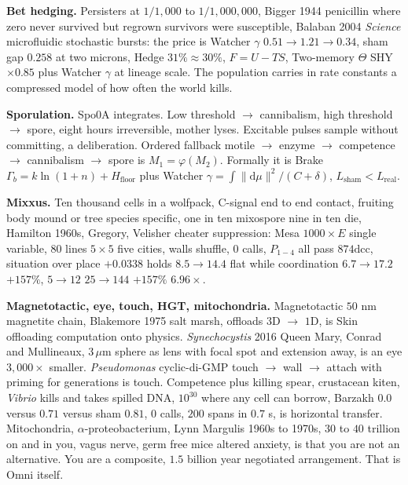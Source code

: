 \documentclass[11pt,a4paper]{article}
\begin{document}
\textbf{Bet hedging.} Persisters at $1/1{,}000$ to $1/1{,}000{,}000$, Bigger 1944 penicillin where zero never survived but regrown survivors were susceptible, Balaban 2004 \textit{Science} microfluidic stochastic bursts: the price is Watcher $\gamma$ $0.51 \to 1.21 \to 0.34$, sham gap $0.258$ at two microns, Hedge $31\% \approx 30\%$, $F = U - TS$, Two-memory $\Theta$ SHY $\times 0.85$ plus Watcher $\gamma$ at lineage scale. The population carries in rate constants a compressed model of how often the world kills.

\textbf{Sporulation.} Spo0A integrates. Low threshold $\to$ cannibalism, high threshold $\to$ spore, eight hours irreversible, mother lyses. Excitable pulses sample without committing, a deliberation. Ordered fallback motile $\to$ enzyme $\to$ competence $\to$ cannibalism $\to$ spore is $M_1 = \varphi(M_2)$. Formally it is Brake $\Gamma_b = k \ln(1+n) + H_{\text{floor}}$ plus Watcher $\gamma = \int \|\mathrm{d}\mu\|^2/(C+\delta)$, $L_{\text{sham}} < L_{\text{real}}$.

\textbf{Mixxus.} Ten thousand cells in a wolfpack, C-signal end to end contact, fruiting body mound or tree species specific, one in ten mixospore nine in ten die, Hamilton 1960s, Gregory, Velisher cheater suppression: Mesa $1000\times E$ single variable, $80$ lines $5 \times 5$ five cities, walls shuffle, $0$ calls, $P_{1-4}$ all pass $874\text{dcc}$, situation over place $+0.0338$ holds $8.5 \to 14.4$ flat while coordination $6.7 \to 17.2$ $+157\%$, $5 \to 12$ $25 \to 144$ $+157\%$ $6.96\times$.

\textbf{Magnetotactic, eye, touch, HGT, mitochondria.} Magnetotactic $50$ nm magnetite chain, Blakemore 1975 salt marsh, offloads $3$D $\to$ $1$D, is Skin offloading computation onto physics. \textit{Synechocystis} 2016 Queen Mary, Conrad and Mullineaux, $3\,\mu$m sphere as lens with focal spot and extension away, is an eye $3{,}000\times$ smaller. \textit{Pseudomonas} cyclic-di-GMP touch $\to$ wall $\to$ attach with priming for generations is touch. Competence plus killing spear, crustacean kiten, \textit{Vibrio} kills and takes spilled DNA, $10^{30}$ where any cell can borrow, Barzakh $0.0$ versus $0.71$ versus sham $0.81$, $0$ calls, $200$ spans in $0.7$ s, is horizontal transfer. Mitochondria, $\alpha$-proteobacterium, Lynn Margulis 1960s to 1970s, $30$ to $40$ trillion on and in you, vagus nerve, germ free mice altered anxiety, is that you are not an alternative. You are a composite, $1.5$ billion year negotiated arrangement. That is Omni itself.
\end{document}
